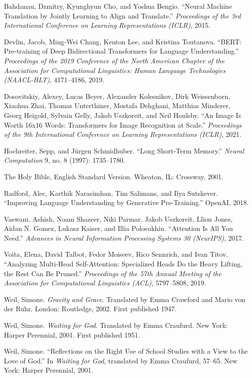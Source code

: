 \documentclass[10pt, letterpaper, twocolumn]{article}
\begin{document}
Bahdanau, Dzmitry, Kyunghyun Cho, and Yoshua Bengio. ``Neural Machine Translation by Jointly Learning to Align and Translate.'' \emph{Proceedings of the 3rd International Conference on Learning Representations (ICLR)}, 2015.

Devlin, Jacob, Ming-Wei Chang, Kenton Lee, and Kristina Toutanova. ``BERT: Pre-training of Deep Bidirectional Transformers for Language Understanding.'' \emph{Proceedings of the 2019 Conference of the North American Chapter of the Association for Computational Linguistics: Human Language Technologies (NAACL-HLT)}, 4171--4186, 2019.

Dosovitskiy, Alexey, Lucas Beyer, Alexander Kolesnikov, Dirk Weissenborn, Xiaohua Zhai, Thomas Unterthiner, Mostafa Dehghani, Matthias Minderer, Georg Heigold, Sylvain Gelly, Jakob Uszkoreit, and Neil Houlsby. ``An Image Is Worth 16x16 Words: Transformers for Image Recognition at Scale.'' \emph{Proceedings of the 9th International Conference on Learning Representations (ICLR)}, 2021.

Hochreiter, Sepp, and Jürgen Schmidhuber. ``Long Short-Term Memory.'' \emph{Neural Computation} 9, no. 8 (1997): 1735--1780.

The Holy Bible, English Standard Version. Wheaton, IL: Crossway, 2001.

Radford, Alec, Karthik Narasimhan, Tim Salimans, and Ilya Sutskever. ``Improving Language Understanding by Generative Pre-Training.'' OpenAI, 2018.

Vaswani, Ashish, Noam Shazeer, Niki Parmar, Jakob Uszkoreit, Llion Jones, Aidan N. Gomez, Lukasz Kaiser, and Illia Polosukhin. ``Attention Is All You Need.'' \emph{Advances in Neural Information Processing Systems 30 (NeurIPS)}, 2017.

Voita, Elena, David Talbot, Fedor Moiseev, Rico Sennrich, and Ivan Titov. ``Analyzing Multi-Head Self-Attention: Specialized Heads Do the Heavy Lifting, the Rest Can Be Pruned.'' \emph{Proceedings of the 57th Annual Meeting of the Association for Computational Linguistics (ACL)}, 5797--5808, 2019.

Weil, Simone. \emph{Gravity and Grace}. Translated by Emma Crawford and Mario von der Ruhr. London: Routledge, 2002. First published 1947.

Weil, Simone. \emph{Waiting for God}. Translated by Emma Craufurd. New York: Harper Perennial, 2001. First published 1951.

Weil, Simone. ``Reflections on the Right Use of School Studies with a View to the Love of God.'' In \emph{Waiting for God}, translated by Emma Craufurd, 57--65. New York: Harper Perennial, 2001.
\end{document}
